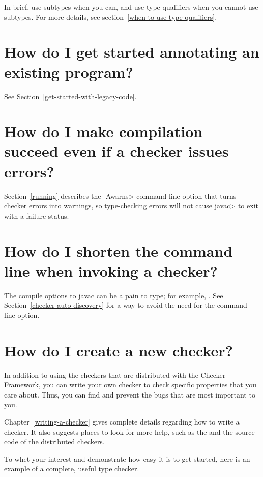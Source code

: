 In brief, use subtypes when you can, and use type qualifiers when you cannot
use subtypes.
For more details, see section~\ref{when-to-use-type-qualifiers}.


\section{How do I get started annotating an existing program?\label{faq-annotate-existing-program}}

See Section~\ref{get-started-with-legacy-code}.


\section{How do I make compilation succeed even if a checker issues errors?\label{faq-awarns}}

Section~\ref{running} describes the \<-Awarns> command-line
option that turns checker errors into warnings, so type-checking errors
will not cause \<javac> to exit with a failure status.


\section{How do I shorten the command line when invoking a checker?\label{faq-shorten-command-line}}

The compile options to javac can be a pain to type; for example,
.
See Section~\ref{checker-auto-discovery} for a way to avoid the need for
the  command-line option.


\section{How do I create a new checker?\label{faq-create-a-checker}}

In addition to using the checkers that are distributed with the Checker
Framework, you can write your own checker to check specific properties that
you care about.  Thus, you can find and prevent the bugs that are most
important to you.

Chapter~\ref{writing-a-checker} gives
complete details regarding how to write a checker.  It also suggests places
to look for more help, such as the  and the source code of the distributed
checkers.

To whet your interest and demonstrate how easy it is to get started, here
is an example of a complete, useful type checker.

